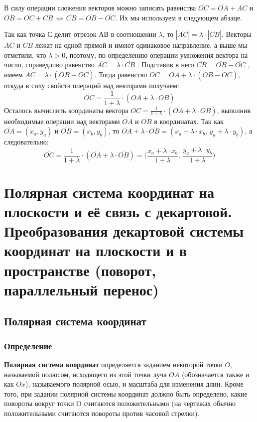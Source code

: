 \documentclass{article}
\begin{document}
В силу операции сложения векторов можно записать
равенства $\overline{OC}=\overline{OA}+\overline{AC}$ и $\overline{OB} = \overline{OC} +\overline{CB}\,\Leftrightarrow\,\overline{CB} = \overline{OB} - \overline{OC}$. Их мы используем в следующем абзаце.

Так как точка $С$ делит отрезок $АВ$ в соотношении $\lambda$, то $|\overline{AC}|=\lambda\cdot|\overline{CB}|$. Векторы $\overline{AC}$ и $\overline{CB}$ лежат на одной прямой и имеют одинаковое направление, а выше мы отметили, что $\lambda>0$, поэтому, по определению операции умножения вектора на число, справедливо равенство $\overline{AC} = \lambda\cdot\overline{CB}$ . Подставив в него $\overline{CB} = \overline{OB} - \overline{OC}$ , имеем $\overline{AC} = \lambda\cdot(\overline{OB} - \overline{OC})$.
Тогда равенство $\overline{OC} = \overline{OA} +\lambda\cdot(\overline{OB} - \overline{OC})$, откуда в силу свойств операций над векторами получаем:
$$ \overline{OC} =\frac{1}{1+\lambda}\cdot(\overline{OA}+\lambda\cdot\overline{OB}) $$
Осталось вычислить координаты вектора $\overline{OC} =\frac{1}{1+\lambda}\cdot(\overline{OA}+\lambda\cdot\overline{OB})$, выполнив необходимые операции над векторами $\overline{OA}$ и $\overline{OB}$ в координатах. Так как $\overline{OA}=(x_a,y_a)$ и $\overline{OB}=(x_b,y_b)$, то $\overline{OA}+\lambda\cdot\overline{OB}=(x_a+\lambda\cdot x_b,\,y_a+\lambda\cdot y_b)$, а следовательно:
$$ \overline{OC}= \frac{1}{1+\lambda}\cdot(\overline{OA}+\lambda\cdot\overline{OB}) = \bigg(\frac{x_a+\lambda\cdot x_b}{1+\lambda},\,\frac{y_a+\lambda\cdot y_b}{1+\lambda}\bigg)$$
\newpage
\section{Полярная система координат на плоскости и её связь с декартовой. Преобразования декартовой системы координат на плоскости и в пространстве (поворот, параллельный перенос)}
\subsection{Полярная система координат}
\subsubsection{Определение}
\textbf{Полярная система координат} определяется заданием некоторой точки $O$, называемой полюсом, исходящего из этой точки луча $OA$ (обозначается также и как $Ox$), называемого полярной осью, и масштаба для изменения длин. Кроме того, при задании полярной системы координат должно быть определено, какие повороты вокруг точки O считаются положительными (на чертежах обычно положительными считаются повороты против часовой стрелки).
\end{document}
